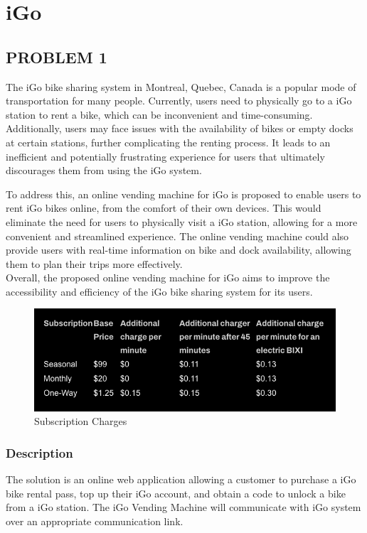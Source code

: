 \chapter{iGo}
\section{PROBLEM 1}
The iGo bike sharing system in Montreal, Quebec, Canada is a popular mode of transportation for many people. Currently, users need to physically go to a iGo station to rent a bike, which can be inconvenient and time-consuming. Additionally, users may face issues with the availability of bikes or empty docks at certain stations, further complicating the renting process. It leads to an inefficient and potentially frustrating experience for users that ultimately discourages them from using the iGo system.\\ \cite{Bikesharing}

To address this, an online vending machine for iGo is proposed to enable users to rent iGo bikes online, from the comfort of their own devices. This would eliminate the need for users to physically visit a iGo station, allowing for a more convenient and streamlined experience. The online vending machine could also provide users with real-time information on bike and dock availability, allowing them to plan their trips more effectively.\\

Overall, the proposed online vending machine for iGo aims to improve the accessibility and efficiency of the iGo bike sharing system for its users.\cite{Pricing}

\begin{figure}[H]
    \centering
    \includegraphics[scale=0.40]{images/BikePrices.png}
    \caption{Subscription Charges}
    \label{fig:my_label1}
\end{figure}

\newpage
\subsection{Description}
The solution is an online web application allowing a customer to purchase a iGo bike rental pass, top up their iGo account, and obtain a code to unlock a bike from a iGo station. The iGo Vending Machine will communicate with iGo system over an appropriate communication link.\\

